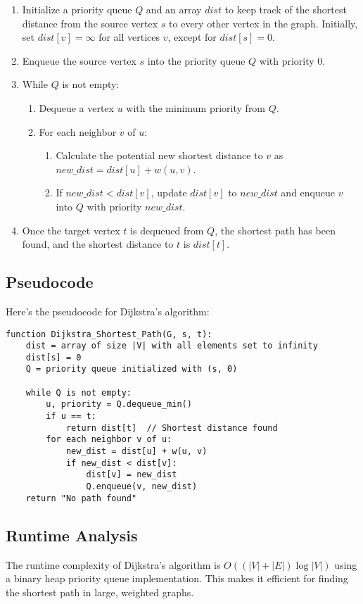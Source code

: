 \begin{enumerate}
    \item Initialize a priority queue $Q$ and an array $dist$ to keep track of the shortest distance from the source vertex $s$ to every other vertex in the graph. Initially, set $dist[v] = \infty$ for all vertices $v$, except for $dist[s] = 0$.
    \item Enqueue the source vertex $s$ into the priority queue $Q$ with priority $0$.
    \item While $Q$ is not empty:
    \begin{enumerate}
        \item Dequeue a vertex $u$ with the minimum priority from $Q$.
        \item For each neighbor $v$ of $u$:
        \begin{enumerate}
            \item Calculate the potential new shortest distance to $v$ as $new\_dist = dist[u] + w(u, v)$.
            \item If $new\_dist < dist[v]$, update $dist[v]$ to $new\_dist$ and enqueue $v$ into $Q$ with priority $new\_dist$.
        \end{enumerate}
    \end{enumerate}
    \item Once the target vertex $t$ is dequeued from $Q$, the shortest path has been found, and the shortest distance to $t$ is $dist[t]$.
\end{enumerate}

\subsection{Pseudocode}
Here's the pseudocode for Dijkstra's algorithm:

\begin{verbatim}
function Dijkstra_Shortest_Path(G, s, t):
    dist = array of size |V| with all elements set to infinity
    dist[s] = 0
    Q = priority queue initialized with (s, 0)
    
    while Q is not empty:
        u, priority = Q.dequeue_min()
        if u == t:
            return dist[t]  // Shortest distance found
        for each neighbor v of u:
            new_dist = dist[u] + w(u, v)
            if new_dist < dist[v]:
                dist[v] = new_dist
                Q.enqueue(v, new_dist)
    return "No path found"
\end{verbatim}

\subsection{Runtime Analysis}
The runtime complexity of Dijkstra's algorithm is $O((|V| + |E|) \log |V|)$ using a binary heap priority queue implementation. This makes it efficient for finding the shortest path in large, weighted graphs.


